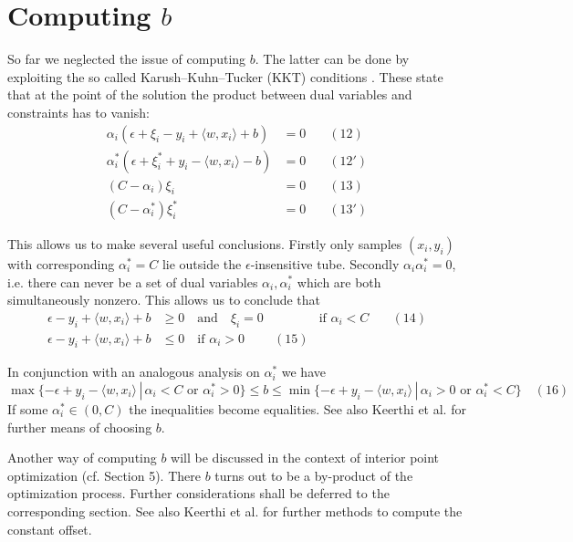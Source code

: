 \documentclass[fleqn,10pt]{olplainarticle}
\begin{document}
\section{Computing \(b\)}

So far we neglected the issue of computing \(b\). The latter can be done by exploiting the so called Karush–Kuhn–Tucker (KKT) conditions \cite{karush1939minima,kuhn1951nonlinear}. These state that at the point of the solution the product between dual variables and constraints has to vanish:
\[
\begin{aligned}
\alpha_i (\epsilon + \xi_i - y_i + \langle w, x_i \rangle + b) &= 0 \quad &(12) \\
\alpha_i^* (\epsilon + \xi_i^* + y_i - \langle w, x_i \rangle - b) &= 0 \quad &(12') \\
(C - \alpha_i)\xi_i &= 0 \quad &(13) \\
(C - \alpha_i^*)\xi_i^* &= 0 \quad &(13')
\end{aligned}
\]

This allows us to make several useful conclusions. Firstly only samples \((x_i , y_i )\) with corresponding \(\alpha_i^* = C\) lie outside the \(\epsilon\)-insensitive tube. Secondly \(\alpha_i \alpha_i^* = 0\), i.e. there can never be a set of dual variables \(\alpha_i, \alpha_i^*\) which are both simultaneously nonzero. This allows us to conclude that
\[
\begin{aligned}
\epsilon - y_i + \langle w, x_i \rangle + b &\geq 0 \quad \text{and} \quad \xi_i = 0 && \text{if } \alpha_i < C \quad &(14) \\
\epsilon - y_i + \langle w, x_i \rangle + b &\leq 0 \quad \text{if } \alpha_i > 0 \quad &(15)
\end{aligned}
\]

In conjunction with an analogous analysis on \(\alpha_i^*\) we have
\[
\max\{-\epsilon + y_i - \langle w, x_i \rangle \,|\, \alpha_i < C \text{ or } \alpha_i^* > 0\} \leq b \leq \min\{-\epsilon + y_i - \langle w, x_i \rangle \,|\, \alpha_i > 0 \text{ or } \alpha_i^* < C\} \quad (16)
\]
If some \(\alpha_i^* \in (0,C)\) the inequalities become equalities. See also Keerthi et al. for further means of choosing \(b\).

Another way of computing \(b\) will be discussed in the context of interior point optimization (cf. Section 5). There \(b\) turns out to be a by-product of the optimization process. Further considerations shall be deferred to the corresponding section. See also Keerthi et al. for further methods to compute the constant offset.
\end{document}
